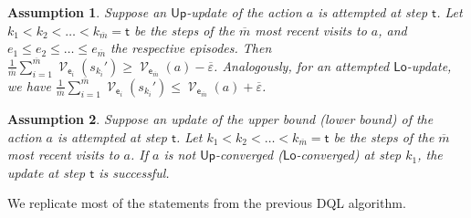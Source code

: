 \documentclass{article}
\DeclareMathOperator{\val}{\mathcal{V}}
\newcommand{\upperbound}{\mathsf{Up}}
\newcommand{\lowerbound}{\mathsf{Lo}}
\newcommand{\updatestep}{{\overline{\varepsilon}}}
\newcommand{\delay}{{\overline{m}}}
\newcommand{\algostep}{\mathsf{t}}
\newcommand{\algoepisode}{\mathsf{e}}
\newtheorem{assumption}{Assumption}
\begin{document}
\begin{assumption} \label{asm:dql:sampled_value_close_to_real_value}
	Suppose an $\upperbound$-update of the action $a$ is attempted at step $\algostep$.
	Let $k_1 < k_2 < \ldots < k_\delay = \algostep$ be the steps of the $\delay$ most recent visits to $a$, and $e_1 \leq e_2 \leq \ldots \leq e_\delay$ the respective episodes.
	Then $\frac{1}{\delay} \sum_{i=1}^\delay \val_{\algoepisode_i}(s_{k_i}') \geq \val_{\algoepisode_\delay}(a) - \updatestep$.
	Analogously, for an attempted $\lowerbound$-update, we have $\frac{1}{\delay} \sum_{i=1}^\delay \val_{\algoepisode_i}(s_{k_i}') \leq \val_{\algoepisode_\delay}(a) + \updatestep$.
\end{assumption}

\begin{assumption} \label{asm:dql:converged_successful_update}
	Suppose an update of the upper bound (lower bound) of the action $a$ is attempted at step $\algostep$.
	Let $k_1 < k_2 < \ldots < k_\delay = \algostep$ be the steps of the $\delay$ most recent visits to $a$.
	If $a$ is not $\upperbound$-converged ($\lowerbound$-converged) at step $k_1$, the update at step $\algostep$ is successful.
\end{assumption}
We replicate most of the statements from the previous DQL algorithm.
\end{document}
